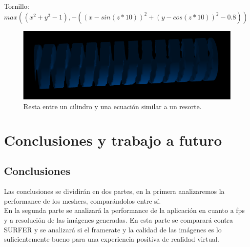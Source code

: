 \documentclass[12pt]{article}
\begin{document}
\clearpage
Tornillo: $max((x^2 + y^2 - 1) ,-((x-sin(z*10) )^2 + (y -cos (z*10))^2 -0.8))$ \\
\begin{figure}[h!]
\includegraphics[width=0.7\linewidth,center]{g5.png}
\caption{Resta entre un cilindro y una ecuación similar a un resorte.}
\end{figure}

\clearpage
\section{Conclusiones y trabajo a futuro}
\subsection{Conclusiones}
Las conclusiones se dividirán en dos partes, en la primera analizaremos la performance de los meshers, comparándolos entre sí. 
\\En la segunda parte se analizará la performance de la aplicación en cuanto a fps y a resolución de las imágenes generadas. En esta parte se comparará contra SURFER y se analizará si el framerate y la calidad de las imágenes es lo suficientemente bueno para una experiencia positiva de realidad virtual.
\end{document}
